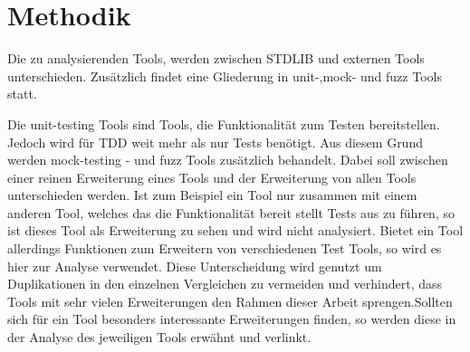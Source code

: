 \section{Methodik}\label{methodik}
Die zu analysierenden Tools, werden zwischen STDLIB und externen Tools 
unterschieden. Zusätzlich findet eine Gliederung in unit-,\gls{mock}- und 
\gls{fuzz} Tools statt.

Die unit-testing Tools sind Tools, die Funktionalität zum Testen bereitstellen.
Jedoch wird für TDD weit mehr als nur Tests benötigt. Aus diesem Grund werden
\gls{mock}-testing - und \gls{fuzz} Tools zusätzlich behandelt. Dabei soll
zwischen einer reinen Erweiterung eines Tools und der Erweiterung von allen
Tools unterschieden werden. Ist zum Beispiel ein Tool nur zusammen mit einem
anderen Tool, welches das die Funktionalität bereit stellt Tests aus zu führen,
so ist dieses Tool als Erweiterung zu sehen und wird nicht analysiert. Bietet
ein Tool allerdings Funktionen zum Erweitern von verschiedenen Test Tools, so
wird es hier zur  Analyse verwendet. Diese Unterscheidung wird genutzt um
Duplikationen in den einzelnen Vergleichen zu vermeiden und verhindert, dass
Tools mit sehr vielen Erweiterungen den Rahmen dieser Arbeit sprengen.Sollten
sich für ein Tool besonders interessante Erweiterungen finden, so werden diese
in der Analyse des jeweiligen Tools erwähnt und verlinkt.
\newline


